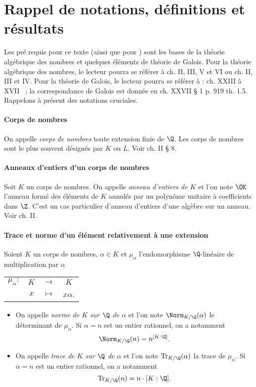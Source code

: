 \section*{Rappel de notations, définitions et résultats}

Les pré requis pour ce texte (ainsi que pour \cite{article}) sont les bases de la théorie algébrique des nombres et quelques éléments de théorie de Galois. Pour la théorie algébrique des nombres, le lecteur pourra se référer à \cite{Samuel} ch. II, III, V et VI ou \cite{Kraus} ch. II, III et IV. Pour la théorie de Galois, le lecteur pourra se référer à \cite{GrandCombat} : ch. XXIII à XVII ~; la correspondance de Galois est donnée en ch. XXVII § 1 p. 919 th. 1.5. Rappelons à présent des notations cruciales.

\paragraph{Corps de nombres} On appelle \emph{corps de nombres} toute extension finie de $\Q$. Les corps de nombres sont le plus souvent désignés par $K$ ou $L$. Voir \cite{Samuel} ch. II § 8.

\paragraph{Anneaux d'entiers d'un corps de nombres} Soit $K$ un corps de nombres. On appelle \emph{anneau d'entiers de $K$} et l'on note $\OK$ l'anneau formé des éléments de $K$ annulés par un polynôme unitaire à coefficients dans $\Z$. C'est un cas particulier d'anneau d'entiers d'une algèbre sur un anneau. Voir \cite{Samuel} ch. II.

\paragraph{Trace et norme d'un élément relativement à une extension} Soient $K$ un corps de nombres, $\alpha\in K$ et $\mu_\alpha$ l'endomorphisme $\Q$-linéaire de multiplication par $\alpha$ 
\begin{center}
	\begin{tabular}{rccc}
		$\mu_\alpha : $ & $K$ & $\longrightarrow$ & $K$ \\
		& $x$	& $\longmapsto$ & $x\alpha$.
	\end{tabular}
\end{center}

\begin{itemize}
	\item On appelle \emph{norme de $K$ sur $\Q$ de $\alpha$} et l'on note $\Norm_{K/\Q}(\alpha)$ le déterminant de $\mu_\alpha$. Si $\alpha=n$ est un entier rationnel, on a notamment \[\Norm_{K/\Q}(n) = n^{[K : \Q]}.\]
	\item On appelle \emph{trace de $K$ sur $\Q$ de $\alpha$} et l'on note $\mathrm{Tr}_{K/\Q}(\alpha)$ la trace de $\mu_\alpha$. Si $\alpha= n$ est un entier rationnel, on a notamment \[\mathrm{Tr}_{K/\Q}(n) = n\cdot{[K : \Q]}.\]
\end{itemize}

